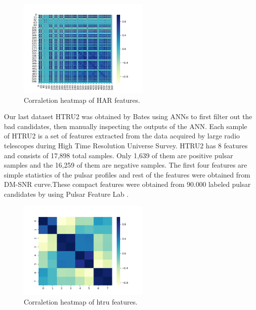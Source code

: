 \documentclass[journal]{IEEEtran}
\begin{document}
\begin{figure}[!ht]
  \centering
  \includegraphics[width=2.5in]{images/cor_heat_har.png}
  \caption{Corraletion heatmap of HAR features.}
  \label{fig_har}
  \end{figure}
  \par
  
  Our last dataset HTRU2 was obtained by Bates\cite{bates2012high} using ANNs to first filter out the bad candidates, then manually inspecting the outputs of the ANN. Each sample of HTRU2 is a set of features extracted from the data acquired by large radio telescopes during High Time Resolution Universe Survey. HTRU2 has 8 features and consists of 17,898 total samples. Only 1,639 of them are positive pulsar samples and the 16,259 of them are negative samples. The first four features are simple statistics of the pulsar profiles and rest of the features were obtained from DM-SNR curve\cite{keith2010high}.These compact features were obtained from 90.000 labeled pulsar candidates by using Pulsar Feature Lab \cite{Lyon2015}.

  \begin{figure}[!ht]
    \centering
    \includegraphics[width=2.5in]{images/cor_heat_htru.png}
    \caption{Corraletion heatmap of htru features.}
    \label{fig_htru}
    \end{figure}
    \par
  
\end{document}
